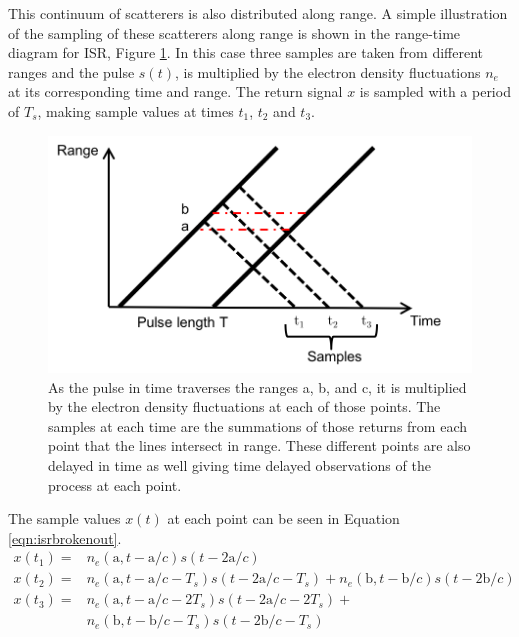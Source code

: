 This continuum of scatterers is also distributed along range. A simple illustration of the sampling of these scatterers along range is shown in the range-time diagram for ISR, Figure \ref{fig:isrfigure}. In this case three samples are taken from different ranges and the pulse $s(t)$, is multiplied by the electron density fluctuations $n_e$ at its corresponding time and range. The return signal $x$ is sampled with a period of $T_s$, making sample values at times $t_1$, $t_2$ and $t_3$. 
\begin{figure}[htb]
\centering
\includegraphics[width=5in]{ISRpicture}
\caption{As the pulse in time traverses the ranges a, b, and c, it is multiplied by the electron density fluctuations at each of those points. The samples at each time are the summations of those returns from each point that the lines intersect in range. These different points are also delayed in time as well giving time delayed observations of the process at each point. }
\label{fig:isrfigure}
\end{figure}
The sample values $x(t)$ at each point can be seen in Equation \ref{eqn:isrbrokenout}.
\begin{equation}
\label{eqn:isrbrokenout}
\begin{split}
 x(t_1)=& n_e(\text{a},t-\text{a}/c)s(t-2\text{a}/c) \\ 
 x(t_2)=& n_e(\text{a},t-\text{a}/c-T_s)s(t-2\text{a}/c-T_s) +  n_e(\text{b},t-\text{b}/c)s(t-2\text{b}/c)\\
 x(t_3)=& n_e(\text{a},t-\text{a}/c-2T_s)s(t-2\text{a}/c-2T_s)   +
 \\ & n_e(\text{b},t-\text{b}/c-T_s)s(t-2\text{b}/c-T_s) 
 \end{split}
\end{equation}

